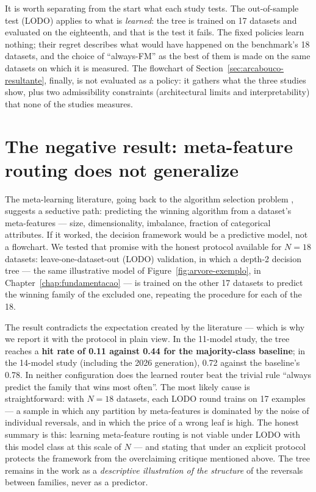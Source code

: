 It is worth separating from the start what each study tests. The
out-of-sample test (LODO) applies to what is \emph{learned}: the
tree is trained on 17 datasets and evaluated on the eighteenth, and
that is the test it fails. The fixed policies learn nothing; their
regret describes what would have happened on the benchmark's 18
datasets, and the choice of ``always-FM'' as the best of them is
made on the same datasets on which it is measured. The flowchart of
Section~\ref{sec:arcabouco-resultante}, finally, is not evaluated as
a policy: it gathers what the three studies show, plus two
admissibility constraints (architectural limits and
interpretability) that none of the studies measures.

\section{The negative result: meta-feature routing does not generalize}
\label{sec:resultado-negativo}

The meta-learning literature, going back to the algorithm selection
problem \citep{rice1976}, suggests a seductive path: predicting the
winning algorithm from a dataset's meta-features --- size,
dimensionality, imbalance, fraction of categorical attributes. If it
worked, the decision framework would be a predictive model, not a
flowchart. We tested that promise with the honest protocol available
for $N{=}18$ datasets: leave-one-dataset-out (LODO) validation, in
which a depth-2 decision tree --- the same illustrative model of
Figure~\ref{fig:arvore-exemplo}, in
Chapter~\ref{chap:fundamentacao} --- is trained on the other 17
datasets to predict the winning family of the excluded one,
repeating the procedure for each of the 18.

The result contradicts the expectation created by the literature ---
which is why we report it with the protocol in plain view. In the
11-model study, the tree reaches a \textbf{hit rate of 0.11 against
0.44 for the majority-class baseline}; in the 14-model study
(including the 2026 generation), 0.72 against the baseline's 0.78.
In neither configuration does the learned router beat the trivial
rule ``always predict the family that wins most often''. The most
likely cause is straightforward: with $N{=}18$ datasets,
each LODO round trains on 17 examples --- a sample in which any
partition by meta-features is dominated by the noise of individual
reversals, and in which the price of a wrong leaf is high. The
honest summary is this: learning meta-feature routing is not viable
under LODO with this model class at this scale of $N$ --- and
stating that under an explicit protocol protects the framework from
the overclaiming critique mentioned above. The tree remains in the
work as a \emph{descriptive illustration of the structure} of the
reversals between families, never as a predictor.

